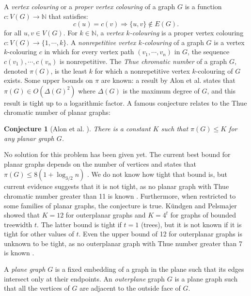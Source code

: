 \documentclass{patmorin}
\newcommand{\naturals}{\mathbb{N}}
\newtheorem{conjecture}[theorem]{Conjecture}
\begin{document}
A \emph{vertex colouring} or a \emph{proper vertex colouring} of a graph $G$ is a function $c: V(G) \rightarrow \naturals$ that satisfies:
\begin{equation}
c(u) = c(v) \Rightarrow \{u,v\} \notin E(G).
\label{eqn:propervcolouring}
\end{equation}
for all $u,v \in V(G)$. For $k \in \naturals$, a \emph{vertex $k$-colouring} is a proper vertex colouring $c : V(G) \rightarrow \{1,\cdots,k\}$.
A \emph{nonrepetitive vertex $k$-colouring} of a graph $G$ is a vertex $k$-colouring $c$ in which for every vertex path $(v_1,\cdots,v_n)$ in $G$, the sequence $c(v_1),\cdots, c(v_n)$ is nonrepetitive. The \emph{Thue chromatic number} of a graph $G$, denoted $\pi(G)$, is the least $k$ for which a nonrepetitive vertex $k$-colouring of $G$ exists. Some upper bounds on $\pi$ are known: a result by Alon et al.\cite{alon2002nonrepetitive} states that $\pi(G) \in O(\Delta(G)^2)$ where $\Delta(G)$ is the maximum degree of $G$, and this result is tight up to a logarithmic factor.  A famous conjecture relates to the Thue chromatic number of planar graphs:
\begin{conjecture}[Alon et al. \cite{alon2002nonrepetitive}]
 There is a constant $K$ such that $\pi(G) \leq K$ for any planar graph $G$.
 \label{conj:planarConstant}
\end{conjecture}
No solution for this problem has been given yet. The current best bound for planar graphs depends on the number of vertices and states that $\pi(G) \leq 8(1+\log_{3/2}n)$ \cite{dujmovic2012planarlogn}. We do not know how tight that bound is, but current evidence suggests that it is not tight, as no planar graph with Thue chromatic number greater than 11 is known \cite{dujmovic2012planarlogn}. Furthermore, when restricted to some families of planar graphs, the conjecture is true.  K{\"u}ndgen and Pelsmajer \cite{kundgen2008nonrepetitive} showed that $K=12$ for outerplanar graphs and $K=4^t$ for graphs of bounded treewidth $t$. The latter bound is tight if $t=1$ (trees), but it is not known if it is tight for other values of $t$. Even the upper bound of 12 for outerplanar graphs is unknown to be tight, as no outerplanar graph with Thue number greater than 7 is known \cite{barat2007square}.

A \emph{plane graph} $G$ is a fixed embedding of a graph in the plane such that its edges intersect only at their endpoints. An \emph{outerplane} graph $G$ is a plane graph such that all the vertices of $G$ are adjacent to the outside face of $G$. 
\end{document}
